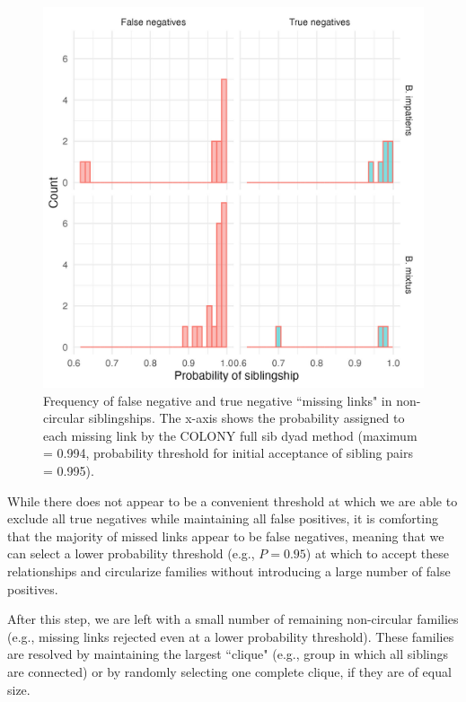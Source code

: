 \documentclass[12pt]{article}
\begin{document}
\begin{figure}[H]
    \centering
    \includegraphics[width=\linewidth]{appendix_figures/noncircularity.jpg}
    \caption{Frequency of false negative and true negative ``missing links" in non-circular siblingships. The x-axis shows the probability assigned to each missing link by the COLONY full sib dyad method (maximum = 0.994, probability threshold for initial acceptance of sibling pairs = 0.995).}
    \label{fig:noncircularity}
\end{figure}

While there does not appear to be a convenient threshold at which we are able to exclude all true negatives while maintaining all false positives, it is comforting that the majority of missed links appear to be false negatives, meaning that we can select a lower probability threshold (e.g., $P = 0.95$) at which to accept these relationships and circularize families without introducing a large number of false positives.

After this step, we are left with a small number of remaining non-circular families (e.g., missing links rejected even at a lower probability threshold). These families are resolved by maintaining the largest ``clique" (e.g., group in which all siblings are connected) or by randomly selecting one complete clique, if they are of equal size.
\end{document}
